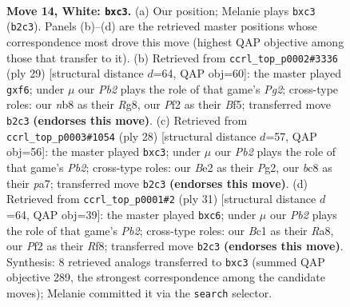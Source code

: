 \documentclass[11pt]{article}
\begin{document}
\clearpage

\begin{figure}[p]\centering
\begin{subfigure}{0.46\textwidth}\centering
\resizebox{\linewidth}{!}{%
\newchessgame
\chessboard[
  setfen={rnbr2k1/ppp5/6p1/5p1p/2P5/2b5/PP2BPPP/R1B1R1K1 w - - 0 14},
  showmover=false,
  pgfstyle=straightmove, color=movearrow, markmove={b2-c3}
]}
\caption{}
\end{subfigure}\hfill
\begin{subfigure}{0.46\textwidth}\centering
\resizebox{\linewidth}{!}{%
\newchessgame
\chessboard[
  setfen={2kr1br1/ppp2pp1/5B2/5b1p/2P5/1P2P2P/P3BPP1/RNK4R b - - 0 15},
  showmover=false,
  pgfstyle=straightmove, color=movearrow, markmove={g7-f6}
]}
\caption{}
\end{subfigure}
\\[4pt]
\begin{subfigure}{0.46\textwidth}\centering
\resizebox{\linewidth}{!}{%
\newchessgame
\chessboard[
  setfen={r1b1k2r/p4ppp/8/3p4/8/2b5/PP3PPP/R1B2RK1 w kq - 0 15},
  showmover=false,
  pgfstyle=straightmove, color=movearrow, markmove={b2-c3}
]}
\caption{}
\end{subfigure}\hfill
\begin{subfigure}{0.46\textwidth}\centering
\resizebox{\linewidth}{!}{%
\newchessgame
\chessboard[
  setfen={r1b2rk1/pp3ppp/2N5/4b3/2P5/6P1/P4PBP/R1BR2K1 b - - 0 16},
  showmover=false,
  pgfstyle=straightmove, color=movearrow, markmove={b7-c6}
]}
\caption{}
\end{subfigure}
\caption{\textbf{Move 14, White: \texttt{bxc3}.} (a) Our position; Melanie plays \texttt{bxc3} (\texttt{b2c3}). Panels (b)--(d) are the retrieved master positions whose correspondence most drove this move (highest QAP objective among those that transfer to it). (b) Retrieved from \texttt{ccrl\_top\_p0002\#3336} (ply 29) [structural distance $d$=64, QAP obj=60]: the master played \texttt{gxf6}; under $\mu$ our \emph{Pb2} plays the role of that game's \emph{Pg2}; cross-type roles: our \emph{n}b8 as their \emph{R}g8, our \emph{P}f2 as their \emph{B}f5; transferred move \texttt{b2c3} \textbf{(endorses this move)}. (c) Retrieved from \texttt{ccrl\_top\_p0003\#1054} (ply 28) [structural distance $d$=57, QAP obj=56]: the master played \texttt{bxc3}; under $\mu$ our \emph{Pb2} plays the role of that game's \emph{Pb2}; cross-type roles: our \emph{B}e2 as their \emph{P}g2, our \emph{b}c8 as their \emph{p}a7; transferred move \texttt{b2c3} \textbf{(endorses this move)}. (d) Retrieved from \texttt{ccrl\_top\_p0001\#2} (ply 31) [structural distance $d$=64, QAP obj=39]: the master played \texttt{bxc6}; under $\mu$ our \emph{Pb2} plays the role of that game's \emph{Pb2}; cross-type roles: our \emph{B}c1 as their \emph{R}a8, our \emph{P}f2 as their \emph{R}f8; transferred move \texttt{b2c3} \textbf{(endorses this move)}. Synthesis: 8 retrieved analogs transferred to \texttt{bxc3} (summed QAP objective 289, the strongest correspondence among the candidate moves); Melanie committed it via the \texttt{search} selector.}
\label{fig:thought-m26}
\end{figure}
\end{document}

